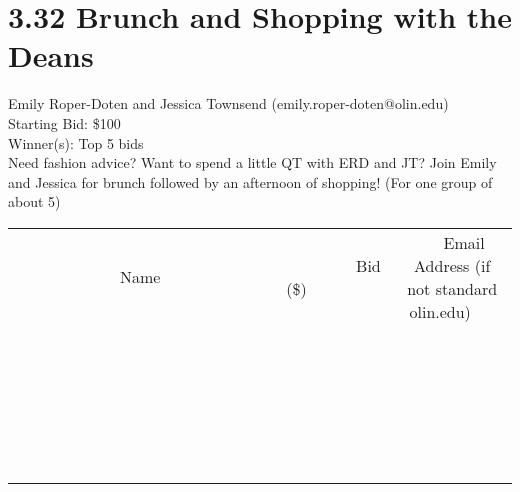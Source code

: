 \documentclass[11pt]{article}
\begin{document}
\section*{3.32 Brunch and Shopping with the Deans}
Emily Roper-Doten and Jessica Townsend (emily.roper-doten@olin.edu) \\
Starting Bid: \$100 \\
Winner(s): 
Top 5 bids \\
Need fashion advice? Want to spend a little QT with ERD and JT? Join Emily and Jessica for brunch followed by an afternoon of shopping! (For one group of about 5) \\[6ex]
\begin{tabular}{c c c}
~~~~~~~~~~~~~Name~~~~~~~~~~~~~ & ~~~~~~~~~Bid (\$)~~~~~~~~~ & ~~~Email Address (if not standard olin.edu)~~~ \\
 & & \\
\hline
 & & \\
\hline
 & & \\
\hline
 & & \\
\hline
 & & \\
\hline
 & & \\
\hline
 & & \\
\hline
 & & \\
\hline
 & & \\
\hline
 & & \\
\hline
 & & \\
\hline
 & & \\
\hline
 & & \\
\hline
 & & \\
\hline
 & & \\
\hline
 & & \\
\hline
 & & \\
\hline
 & & \\
\hline
 & & \\
\hline
 & & \\
\hline
 & & \\
\hline
 & & \\
\hline
 & & \\
\hline
 & & \\
\hline
 & & \\
\hline
 & & \\
\hline
\end{tabular}
\clearpage
\end{document}
